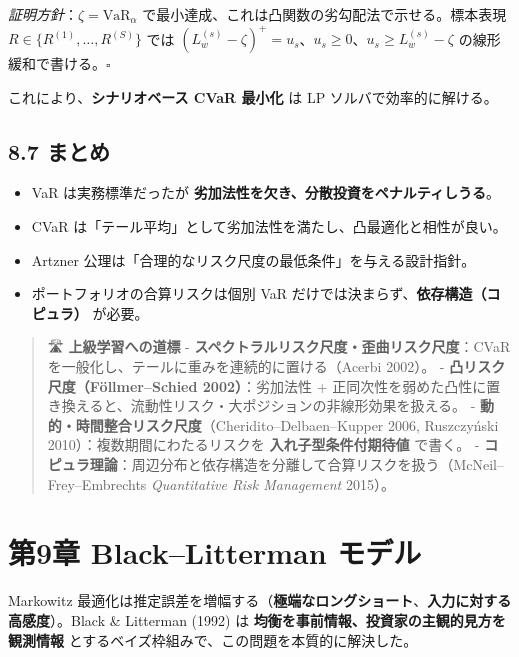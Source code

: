 \documentclass[11pt,a4paper]{report}
\begin{document}
\emph{証明方針}：$\zeta = \mathrm{VaR}_\alpha$ で最小達成、これは凸関数の劣勾配法で示せる。標本表現 $R \in \{R^{(1)}, \dots, R^{(S)}\}$ では $(L_w^{(s)} - \zeta)^+ = u_s$、$u_s \ge 0$、$u_s \ge L_w^{(s)} - \zeta$ の線形緩和で書ける。$\square$

これにより、\textbf{シナリオベース CVaR 最小化} は LP ソルバで効率的に解ける。

\section{8.7 まとめ}

\begin{itemize}
\item VaR は実務標準だったが \textbf{劣加法性を欠き、分散投資をペナルティしうる}。
\item CVaR は「テール平均」として劣加法性を満たし、凸最適化と相性が良い。
\item Artzner 公理は「合理的なリスク尺度の最低条件」を与える設計指針。
\item ポートフォリオの合算リスクは個別 VaR だけでは決まらず、\textbf{依存構造（コピュラ）} が必要。
\end{itemize}

\begin{quote}
🛣 \textbf{上級学習への道標}
- \textbf{スペクトラルリスク尺度・歪曲リスク尺度}：CVaR を一般化し、テールに重みを連続的に置ける（Acerbi 2002）。
- \textbf{凸リスク尺度（Föllmer–Schied 2002）}：劣加法性 + 正同次性を弱めた凸性に置き換えると、流動性リスク・大ポジションの非線形効果を扱える。
- \textbf{動的・時間整合リスク尺度}（Cheridito–Delbaen–Kupper 2006, Ruszczyński 2010）：複数期間にわたるリスクを \textbf{入れ子型条件付期待値} で書く。
- \textbf{コピュラ理論}：周辺分布と依存構造を分離して合算リスクを扱う（McNeil–Frey–Embrechts \emph{Quantitative Risk Management} 2015）。
\end{quote}

\noindent\hrulefill

\chapter{第9章 Black–Litterman モデル}

Markowitz 最適化は推定誤差を増幅する（\textbf{極端なロングショート}、\textbf{入力に対する高感度}）。Black \& Litterman (1992) は \textbf{均衡を事前情報、投資家の主観的見方を観測情報} とするベイズ枠組みで、この問題を本質的に解決した。
\end{document}
